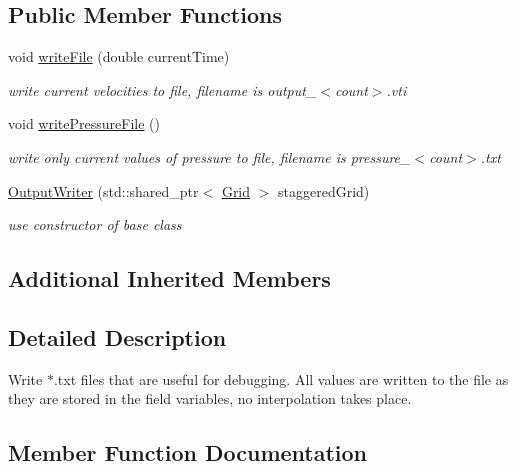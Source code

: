 \subsection*{Public Member Functions}
\begin{DoxyCompactItemize}
\item 
void \mbox{\hyperlink{classOutputWriterText_a25a12ea2524fc34e9acb19ef1f4c7431}{write\+File}} (double current\+Time)
\begin{DoxyCompactList}\small\item\em write current velocities to file, filename is output\+\_\+$<$count$>$.\+vti \end{DoxyCompactList}\item 
void \mbox{\hyperlink{classOutputWriterText_a3480b58a23fd158f16d0ef9c1b67cbfd}{write\+Pressure\+File}} ()
\begin{DoxyCompactList}\small\item\em write only current values of pressure to file, filename is pressure\+\_\+$<$count$>$.\+txt \end{DoxyCompactList}\item 
\mbox{\hyperlink{classOutputWriterText_aa42fc9f21e7a107080c94c413b6b713b}{Output\+Writer}} (std\+::shared\+\_\+ptr$<$ \mbox{\hyperlink{classGrid}{Grid}} $>$ staggered\+Grid)
\begin{DoxyCompactList}\small\item\em use constructor of base class \end{DoxyCompactList}\end{DoxyCompactItemize}
\subsection*{Additional Inherited Members}


\subsection{Detailed Description}
Write $\ast$.txt files that are useful for debugging. All values are written to the file as they are stored in the field variables, no interpolation takes place. 

\subsection{Member Function Documentation}
\mbox{\label{classOutputWriterText_aa42fc9f21e7a107080c94c413b6b713b}} 
